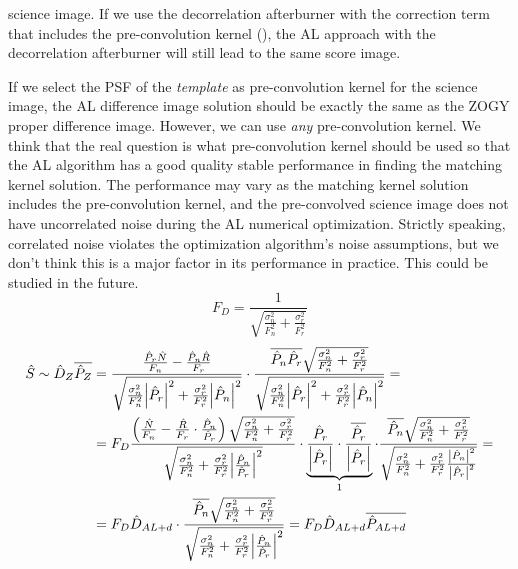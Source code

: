 science image. If we use the decorrelation afterburner with the
correction term that includes the pre-convolution kernel
(), the AL approach with the decorrelation
afterburner will still lead to the same score image.
%
\par If we select the PSF of the \emph{template} as pre-convolution
kernel for the science image, the AL difference image solution should
be exactly the same as the ZOGY proper difference image. However, we
can use \emph{any} pre-convolution kernel. We think that the real
question is what pre-convolution kernel should be used so that the AL
algorithm has a good quality stable performance in finding the
matching kernel solution. The performance may vary as the matching
kernel solution includes the pre-convolution kernel, and the
pre-convolved science image does not have uncorrelated noise during
the AL numerical optimization. Strictly speaking, correlated noise
violates the optimization algorithm’s noise assumptions, but we don't think this is a
major factor in its performance in practice. This could be studied in the future.
%
\begin{equation}
F_D = \frac{1}{\sqrt{\frac{\sigma_n^2}{F_n^2} + \frac{\sigma_r^2}{F_r^2}}}
\end{equation}
%
\begin{align}
  \hat{S} \sim \hat{D}_Z\overline{\hat{P}_Z} &= \frac
  {\frac{\hat{P}_r\hat{N}}{F_n} - \frac{\hat{P}_n\hat{R}}{F_r}}
  {\sqrt{\frac{\sigma_n^2}{F_n^2}\abs{\hat{P}_r}^2 +
      \frac{\sigma_r^2}{F_r^2}\abs{\hat{P}_n}^2}}
  \cdot
  \frac{\overline{\hat{P}_n\hat{P}_r}\sqrt{\frac{\sigma_n^2}{F_n^2} + \frac{\sigma_r^2}{F_r^2}}}
  {\sqrt{\frac{\sigma_n^2}{F_n^2}\abs{\hat{P}_r}^2 +
      \frac{\sigma_r^2}{F_r^2}\abs{\hat{P}_n}^2}} = \label{eq:DzPz}\\
 &= F_D \frac
  {\left(\frac{\hat{N}}{F_n} -  \frac{\hat{R}}{F_r} \cdot
    \frac{\hat{P}_n}{\hat{P}_r}\right) \sqrt{\frac{\sigma_n^2}{F_n^2} + \frac{\sigma_r^2}{F_r^2}} }
  {\sqrt{\frac{\sigma_n^2}{F_n^2} +
      \frac{\sigma_r^2}{F_r^2}\abs{\frac{\hat{P}_n}{\hat{P}_r}}^2}}
  \cdot
  \underbrace{
  \frac{\hat{P}_r}{\abs{\hat{P}_r}}
  \cdot
  \frac{\overline{\hat{P}_r}}{\abs{\hat{P}_r}}
  }_{1} %
  \cdot
  \frac{\overline{\hat{P}_n}\sqrt{\frac{\sigma_n^2}{F_n^2} + \frac{\sigma_r^2}{F_r^2}}}
  {\sqrt{\frac{\sigma_n^2}{F_n^2} +
      \frac{\sigma_r^2}{F_r^2}\frac{\abs{\hat{P}_n}^2}{\abs{\hat{P}_r}^2}}} = \\
  &= F_D \hat{D}_{AL+d} \cdot \frac{\overline{\hat{P}_n}
  \sqrt{\frac{\sigma_n^2}{F_n^2} + \frac{\sigma_r^2}{F_r^2}}}
  {\sqrt{\frac{\sigma_n^2}{F_n^2} +
      \frac{\sigma_r^2}{F_r^2}\abs{\frac{\hat{P}_n}{\hat{P}_r}}^2}} =
F_D \hat{D}_{AL+d}\overline{\hat{P}_{AL+d}}
\label{eq:DalDzPrPr}
\end{align}

